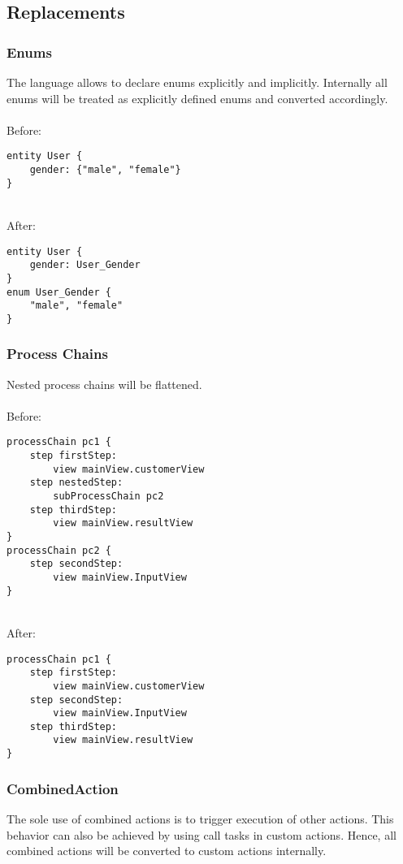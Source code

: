 \subsection{Replacements}
\subsubsection{Enums}
The \MD language allows to declare enums explicitly and implicitly. Internally all enums will be treated as explicitly defined enums and converted accordingly. \\ \\
Before:
\begin{lstlisting}[language=MD2]
entity User {
	gender: {"male", "female"}
}
\end{lstlisting}
~
\\
After:
\begin{lstlisting}[language=MD2]
entity User {
	gender: User_Gender
}
enum User_Gender {
	"male", "female"
}
\end{lstlisting}


\subsubsection{Process Chains}
Nested process chains will be flattened. \\ \\
Before:
\begin{lstlisting}[language=MD2]
processChain pc1 {
	step firstStep:
		view mainView.customerView
	step nestedStep:
		subProcessChain pc2
	step thirdStep:
		view mainView.resultView
}
processChain pc2 {
	step secondStep:
		view mainView.InputView
}
\end{lstlisting}
\newpage
~
\\
After:
\begin{lstlisting}[language=MD2]
processChain pc1 {
	step firstStep:
		view mainView.customerView
	step secondStep:
		view mainView.InputView
	step thirdStep:
		view mainView.resultView
}

\end{lstlisting}

\subsubsection{CombinedAction}
The sole use of combined actions is to trigger execution of other actions. This behavior can also be achieved by using call tasks in custom actions. Hence, all combined actions will be converted to custom actions internally.

